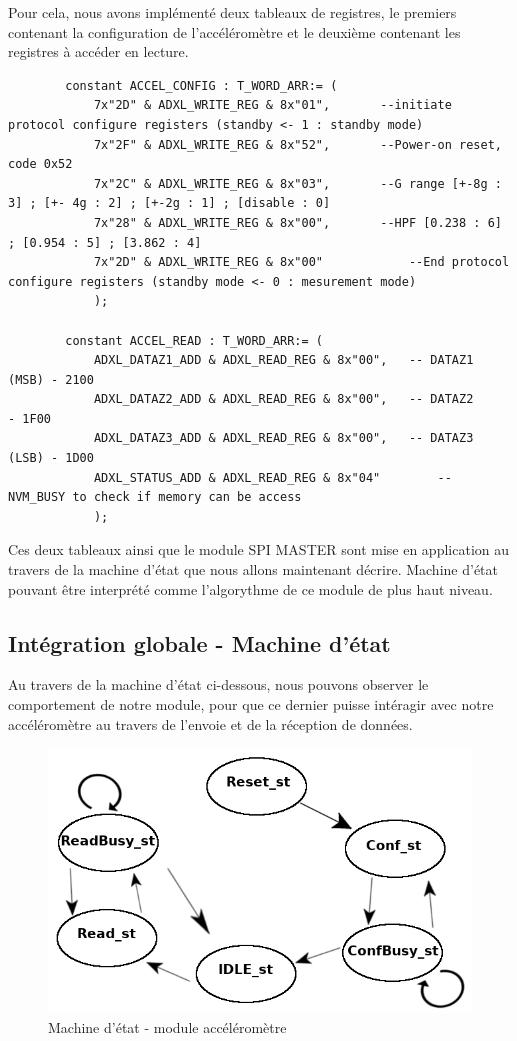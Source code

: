 \documentclass[french,a4paper,12pt]{report}
\begin{document}
			Pour cela, nous avons implémenté deux tableaux de registres, le premiers contenant la configuration de l'accéléromètre et le deuxième contenant les registres à accéder en lecture.
		\begin{lstlisting}
 		constant ACCEL_CONFIG : T_WORD_ARR:= (
			7x"2D" & ADXL_WRITE_REG & 8x"01",		--initiate protocol configure registers (standby <- 1 : standby mode)
			7x"2F" & ADXL_WRITE_REG & 8x"52",		--Power-on reset, code 0x52		
			7x"2C" & ADXL_WRITE_REG & 8x"03",		--G range [+-8g : 3] ; [+- 4g : 2] ; [+-2g : 1] ; [disable : 0]
			7x"28" & ADXL_WRITE_REG & 8x"00",		--HPF [0.238 : 6] ; [0.954 : 5] ; [3.862 : 4]
			7x"2D" & ADXL_WRITE_REG & 8x"00"			--End protocol configure registers (standby mode <- 0 : mesurement mode)
			);
			
		constant ACCEL_READ : T_WORD_ARR:= (
			ADXL_DATAZ1_ADD & ADXL_READ_REG & 8x"00", 	-- DATAZ1 (MSB) - 2100
			ADXL_DATAZ2_ADD & ADXL_READ_REG & 8x"00", 	-- DATAZ2		 		- 1F00
			ADXL_DATAZ3_ADD & ADXL_READ_REG & 8x"00", 	-- DATAZ3 (LSB)	- 1D00
			ADXL_STATUS_ADD & ADXL_READ_REG & 8x"04"		-- NVM_BUSY to check if memory can be access
			);
		\end{lstlisting}
		
		Ces deux tableaux ainsi que le module SPI MASTER sont mise en application au travers de la machine d'état que nous allons maintenant décrire. Machine d'état pouvant être interprété comme l'algorythme de ce module de plus haut niveau.			
		
		\subsection{Intégration globale - Machine d'état}
				Au travers de la machine d'état ci-dessous, nous pouvons observer le comportement de notre module, pour que ce dernier puisse intéragir avec notre accéléromètre au travers de l'envoie et de la réception de données.
		
			\begin{figure}[!ht]
    		\center
  			\includegraphics[width=12cm]{acc_StateMach.png}
    		\caption{Machine d'état - module accéléromètre}
			\end{figure}
			
\end{document}
